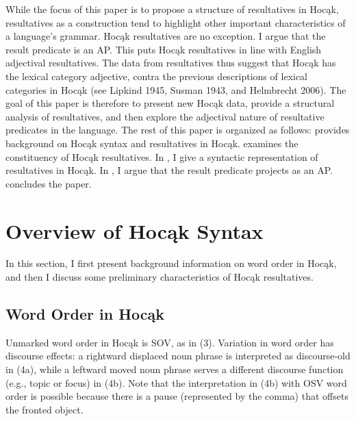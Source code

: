 \documentclass[output=paper]{LSP/langsci}
\begin{document}
While the focus of this paper is to propose a structure of resultatives in Hocąk, resultatives as a construction tend to highlight other important characteristics of a language's grammar. Hocąk resultatives are no exception. I argue that the result predicate is an AP. This puts Hocąk resultatives in line with English adjectival resultatives. The data from resultatives
thus suggest that Hocąk has the lexical category adjective, contra the previous descriptions of lexical categories in Hocąk (see Lipkind 1945, Susman 1943, and Helmbrecht 2006). The goal of this paper is therefore to present new Hocąk data, provide a structural analysis of resultatives, and then explore the adjectival nature of resultative predicates in the language. The rest of this paper is organized as follows:  provides background on Hocąk syntax and resultatives in Hocąk.  examines the constituency of Hocąk resultatives. In , I give a syntactic representation of resultatives in Hocąk. In , I argue that the result predicate projects as an AP.  concludes the paper.

\section{Overview of Hocąk Syntax}

In this section, I first present background information on word order in Hocąk, and then I discuss some preliminary characteristics of Hocąk resultatives.

\subsection{Word Order in Hocąk}

Unmarked word order in Hocąk is SOV, as in (3). Variation in word order has discourse effects: a rightward displaced noun phrase is interpreted as discourse-old in (4a), while a leftward moved noun phrase serves a different discourse function (e.g., topic or focus) in (4b). Note that the interpretation in (4b) with OSV word order is possible because there is a pause (represented by the comma) that offsets the fronted object.

\end{document}

